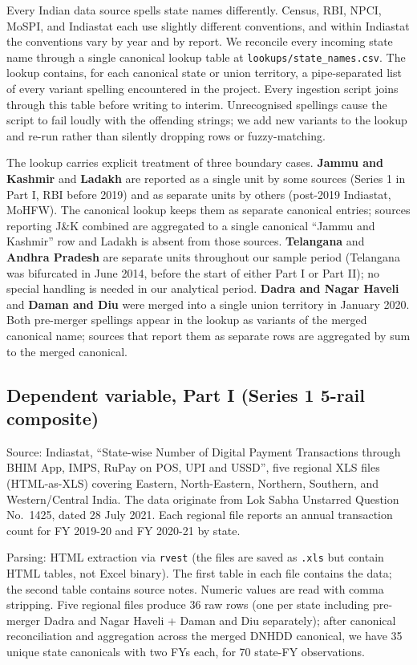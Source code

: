 \documentclass[
]{article}
\begin{document}
Every Indian data source spells state names differently. Census, RBI,
NPCI, MoSPI, and Indiastat each use slightly different conventions, and
within Indiastat the conventions vary by year and by report. We
reconcile every incoming state name through a single canonical lookup
table at \texttt{lookups/state\_names.csv}. The lookup contains, for
each canonical state or union territory, a pipe-separated list of every
variant spelling encountered in the project. Every ingestion script
joins through this table before writing to interim. Unrecognised
spellings cause the script to fail loudly with the offending strings; we
add new variants to the lookup and re-run rather than silently dropping
rows or fuzzy-matching.

The lookup carries explicit treatment of three boundary cases.
\textbf{Jammu and Kashmir} and \textbf{Ladakh} are reported as a single
unit by some sources (Series 1 in Part I, RBI before 2019) and as
separate units by others (post-2019 Indiastat, MoHFW). The canonical
lookup keeps them as separate canonical entries; sources reporting J\&K
combined are aggregated to a single canonical ``Jammu and Kashmir'' row
and Ladakh is absent from those sources. \textbf{Telangana} and
\textbf{Andhra Pradesh} are separate units throughout our sample period
(Telangana was bifurcated in June 2014, before the start of either Part
I or Part II); no special handling is needed in our analytical period.
\textbf{Dadra and Nagar Haveli} and \textbf{Daman and Diu} were merged
into a single union territory in January 2020. Both pre-merger spellings
appear in the lookup as variants of the merged canonical name; sources
that report them as separate rows are aggregated by sum to the merged
canonical.

\subsection{Dependent variable, Part I (Series 1 5-rail
composite)}\label{dependent-variable-part-i-series-1-5-rail-composite}

Source: Indiastat, ``State-wise Number of Digital Payment Transactions
through BHIM App, IMPS, RuPay on POS, UPI and USSD'', five regional XLS
files (HTML-as-XLS) covering Eastern, North-Eastern, Northern, Southern,
and Western/Central India. The data originate from Lok Sabha Unstarred
Question No.~1425, dated 28 July 2021. Each regional file reports an
annual transaction count for FY 2019-20 and FY 2020-21 by state.

Parsing: HTML extraction via \texttt{rvest} (the files are saved as
\texttt{.xls} but contain HTML tables, not Excel binary). The first
table in each file contains the data; the second table contains source
notes. Numeric values are read with comma stripping. Five regional files
produce 36 raw rows (one per state including pre-merger Dadra and Nagar
Haveli + Daman and Diu separately); after canonical reconciliation and
aggregation across the merged DNHDD canonical, we have 35 unique state
canonicals with two FYs each, for 70 state-FY observations.
\end{document}

